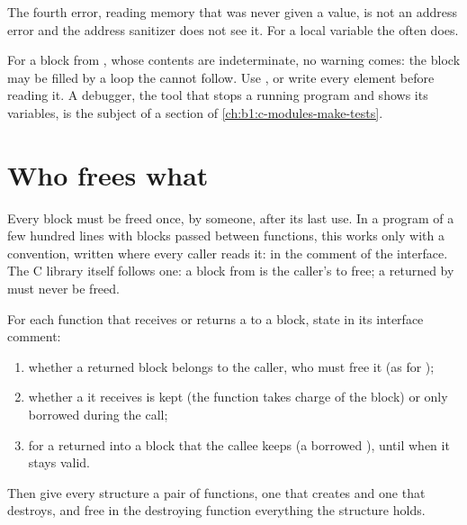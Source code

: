 The fourth error, reading memory that was never given a value, is not an address error and the address sanitizer
does not see it. For a local variable the  often does.

\label{lst:b1:dynamic-memory:uninit}

\label{out:b1:dynamic-memory:uninit}

For a block from , whose contents are indeterminate, no warning comes: the block may be filled by a
loop the  cannot follow. Use , or write every element before reading it. A debugger, the tool
that stops a running program and shows its variables, is the subject of a section of
\cref{ch:b1:c-modules-make-tests}.

\section{Who frees what}\label{sec:b1:dynamic-memory:convention}

Every block must be freed once, by someone, after its last use. In a program of a few hundred lines with blocks passed
between functions, this works only with a convention, written where every caller reads it: in the comment of the
interface. The C library itself follows one: a block from  is the caller's to free; a  returned by
 must never be freed.

\begin{method}\label{met:b1:dynamic-memory:convention}
For each function that receives or returns a  to a  block, state in its interface comment:
\begin{enumerate}
\item whether a returned block belongs to the caller, who must free it (as for );
\item whether a  it receives is kept (the function takes charge of the block) or only borrowed during the call;
\item for a returned  into a block that the callee keeps (a borrowed ), until when it stays valid.
\end{enumerate}
Then give every structure a pair of functions, one that creates and one that destroys, and free in the destroying
function everything the structure holds.
\end{method}

